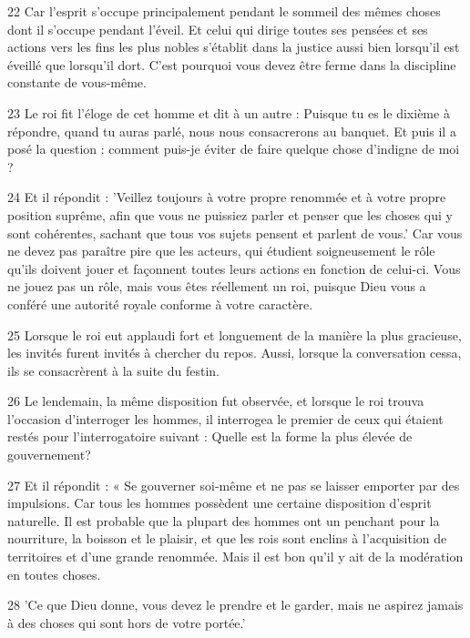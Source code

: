 \par 22 Car l'esprit s'occupe principalement pendant le sommeil des mêmes choses dont il s'occupe pendant l'éveil. Et celui qui dirige toutes ses pensées et ses actions vers les fins les plus nobles s’établit dans la justice aussi bien lorsqu’il est éveillé que lorsqu’il dort. C’est pourquoi vous devez être ferme dans la discipline constante de vous-même.

\par 23 Le roi fit l'éloge de cet homme et dit à un autre : Puisque tu es le dixième à répondre, quand tu auras parlé, nous nous consacrerons au banquet. Et puis il a posé la question : comment puis-je éviter de faire quelque chose d’indigne de moi ?

\par 24 Et il répondit : 'Veillez toujours à votre propre renommée et à votre propre position suprême, afin que vous ne puissiez parler et penser que les choses qui y sont cohérentes, sachant que tous vos sujets pensent et parlent de vous.' Car vous ne devez pas paraître pire que les acteurs, qui étudient soigneusement le rôle qu'ils doivent jouer et façonnent toutes leurs actions en fonction de celui-ci. Vous ne jouez pas un rôle, mais vous êtes réellement un roi, puisque Dieu vous a conféré une autorité royale conforme à votre caractère.

\par 25 Lorsque le roi eut applaudi fort et longuement de la manière la plus gracieuse, les invités furent invités à chercher du repos. Aussi, lorsque la conversation cessa, ils se consacrèrent à la suite du festin.

\par 26 Le lendemain, la même disposition fut observée, et lorsque le roi trouva l'occasion d'interroger les hommes, il interrogea le premier de ceux qui étaient restés pour l'interrogatoire suivant : Quelle est la forme la plus élevée de gouvernement?

\par 27 Et il répondit : « Se gouverner soi-même et ne pas se laisser emporter par des impulsions. Car tous les hommes possèdent une certaine disposition d’esprit naturelle. Il est probable que la plupart des hommes ont un penchant pour la nourriture, la boisson et le plaisir, et que les rois sont enclins à l'acquisition de territoires et d'une grande renommée. Mais il est bon qu'il y ait de la modération en toutes choses.

\par 28 'Ce que Dieu donne, vous devez le prendre et le garder, mais ne aspirez jamais à des choses qui sont hors de votre portée.'

